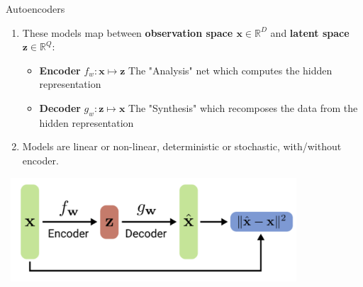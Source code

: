 \documentclass[serif, aspectratio=169]{beamer}
\begin{document}
\begin{frame}{Autoencoders}
    \begin{enumerate}
        \item These models map between \textbf{\textcolor{deepblue}{observation space $\mathbf{x} \in \mathbb{R}^D$}} and \textbf{\textcolor{deepblue}{latent space $\mathbf{z} \in \mathbb{R}^Q$}}:
        
        \begin{itemize}
            \item \textbf{\textcolor{deepblue}{Encoder}} \quad \( f_w  :  \mathbf{x} \mapsto \mathbf{z} \)   \hspace{em} {\tiny{The "Analysis" net which computes the hidden representation}}
            \item \textbf{\textcolor{deepblue}{Decoder}} \quad \( g_w : \mathbf{z} \mapsto \mathbf{x} \)   \hspace{em} {\tiny{The "Synthesis" which recomposes the data from the hidden representation}}
        \end{itemize}
        
        \vspace{0.3cm}

        \item Models are linear or non-linear, deterministic or stochastic, with/without encoder.
    \end{enumerate}
    
    
    \begin{center}
\        \includegraphics[width=0.8\textwidth]{pic/AE1.png}\
    \end{center}
\end{frame}
\end{document}
